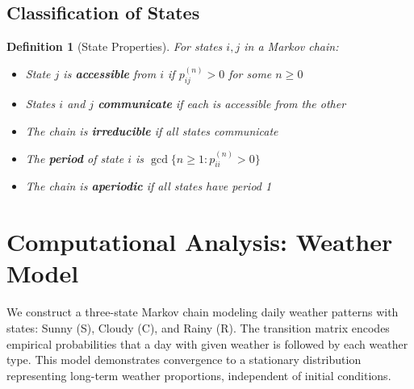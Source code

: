 \documentclass[11pt,a4paper]{article}
\newtheorem{definition}{Definition}[section]
\begin{document}
\subsection{Classification of States}

\begin{definition}[State Properties]
For states $i, j$ in a Markov chain:
\begin{itemize}
\item State $j$ is \textbf{accessible} from $i$ if $p_{ij}^{(n)} > 0$ for some $n \geq 0$
\item States $i$ and $j$ \textbf{communicate} if each is accessible from the other
\item The chain is \textbf{irreducible} if all states communicate
\item The \textbf{period} of state $i$ is $\gcd\{n \geq 1 : p_{ii}^{(n)} > 0\}$
\item The chain is \textbf{aperiodic} if all states have period 1
\end{itemize}
\end{definition}

\section{Computational Analysis: Weather Model}

We construct a three-state Markov chain modeling daily weather patterns with states: Sunny (S), Cloudy (C), and Rainy (R). The transition matrix encodes empirical probabilities that a day with given weather is followed by each weather type. This model demonstrates convergence to a stationary distribution representing long-term weather proportions, independent of initial conditions.
\end{document}
